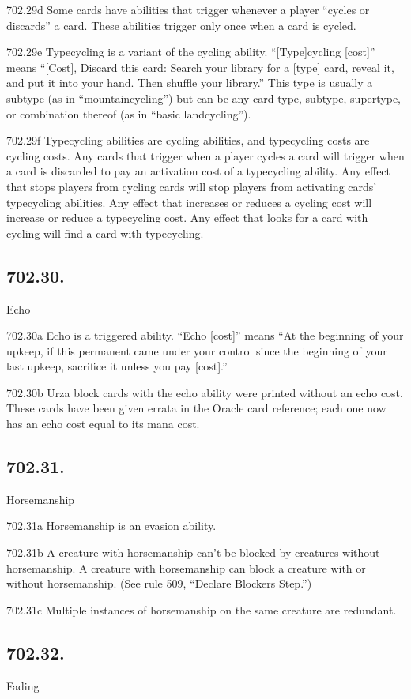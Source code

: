 702.29d Some cards have abilities that trigger whenever a player “cycles or discards” a card. These abilities trigger only once when a card is cycled.

702.29e Typecycling is a variant of the cycling ability. “[Type]cycling [cost]” means “[Cost], Discard this card: Search your library for a [type] card, reveal it, and put it into your hand. Then shuffle your library.” This type is usually a subtype (as in “mountaincycling”) but can be any card type, subtype, supertype, or combination thereof (as in “basic landcycling”).

702.29f Typecycling abilities are cycling abilities, and typecycling costs are cycling costs. Any cards that trigger when a player cycles a card will trigger when a card is discarded to pay an activation cost of a typecycling ability. Any effect that stops players from cycling cards will stop players from activating cards’ typecycling abilities. Any effect that increases or reduces a cycling cost will increase or reduce a typecycling cost. Any effect that looks for a card with cycling will find a card with typecycling.

\subsection*{702.30.}
Echo

702.30a Echo is a triggered ability. “Echo [cost]” means “At the beginning of your upkeep, if this permanent came under your control since the beginning of your last upkeep, sacrifice it unless you pay [cost].”

702.30b Urza block cards with the echo ability were printed without an echo cost. These cards have been given errata in the Oracle card reference; each one now has an echo cost equal to its mana cost.

\subsection*{702.31.}
Horsemanship

702.31a Horsemanship is an evasion ability.

702.31b A creature with horsemanship can’t be blocked by creatures without horsemanship. A creature with horsemanship can block a creature with or without horsemanship. (See rule 509, “Declare Blockers Step.”)

702.31c Multiple instances of horsemanship on the same creature are redundant.

\subsection*{702.32.}
Fading

